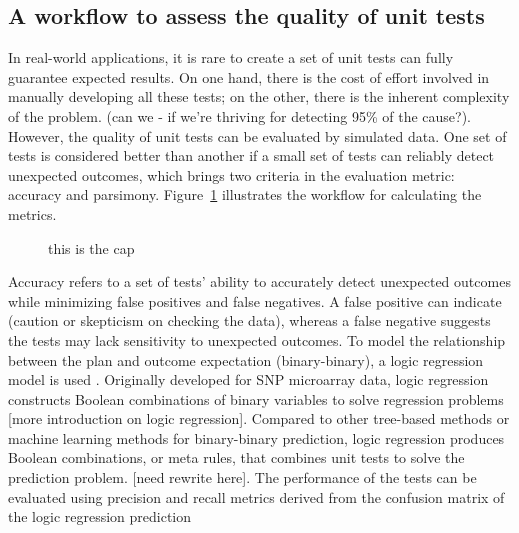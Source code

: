 \documentclass[
  12pt,
]{interact}
\begin{document}
\subsection{A workflow to assess the quality of unit
tests}\label{a-workflow-to-assess-the-quality-of-unit-tests}

In real-world applications, it is rare to create a set of unit tests can
fully guarantee expected results. On one hand, there is the cost of
effort involved in manually developing all these tests; on the other,
there is the inherent complexity of the problem. (can we - if we're
thriving for detecting 95\% of the cause?). However, the quality of unit
tests can be evaluated by simulated data. One set of tests is considered
better than another if a small set of tests can reliably detect
unexpected outcomes, which brings two criteria in the evaluation metric:
accuracy and parsimony. Figure~\ref{fig-metric-calc} illustrates the
workflow for calculating the metrics.

\label{cell-fig-metric-calc}
\begin{figure}[H]


\caption{\label{fig-metric-calc}this is the cap}

\end{figure}%

Accuracy refers to a set of tests' ability to accurately detect
unexpected outcomes while minimizing false positives and false
negatives. A false positive can indicate (caution or skepticism on
checking the data), whereas a false negative suggests the tests may lack
sensitivity to unexpected outcomes. To model the relationship between
the plan and outcome expectation (binary-binary), a logic regression
model is used \citep{ruczinski_logic_2003}. Originally developed for SNP
microarray data, logic regression constructs Boolean combinations of
binary variables to solve regression problems {[}more introduction on
logic regression{]}. Compared to other tree-based methods or machine
learning methods for binary-binary prediction, logic regression produces
Boolean combinations, or meta rules, that combines unit tests to solve
the prediction problem. {[}need rewrite here{]}. The performance of the
tests can be evaluated using precision and recall metrics derived from
the confusion matrix of the logic regression prediction
\end{document}
